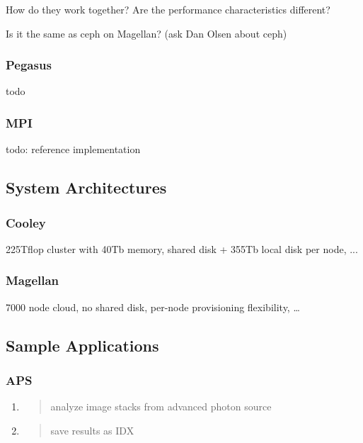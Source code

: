 How do they work together? Are the performance characteristics
different?

Is it the same as ceph on Magellan? (ask Dan Olsen about ceph)

\subsubsection{Pegasus}\label{pegasus}

todo

\subsubsection{MPI}\label{mpi}

todo: reference implementation

\subsection{System Architectures}\label{system-architectures}

\subsubsection{Cooley}\label{cooley}

225Tflop cluster with 40Tb memory, shared disk + 355Tb local disk per
node, ...

\subsubsection{Magellan}\label{magellan}

7000 node cloud, no shared disk, per-node provisioning flexibility,
\ldots{}

\subsection{Sample Applications}\label{sample-applications}

\subsubsection{APS}\label{aps}

\begin{enumerate}
\def\labelenumi{\arabic{enumi}.}
\item
  \begin{quote}
  analyze image stacks from advanced photon source
  \end{quote}
\item
  \begin{quote}
  save results as IDX
  \end{quote}
\end{enumerate}

